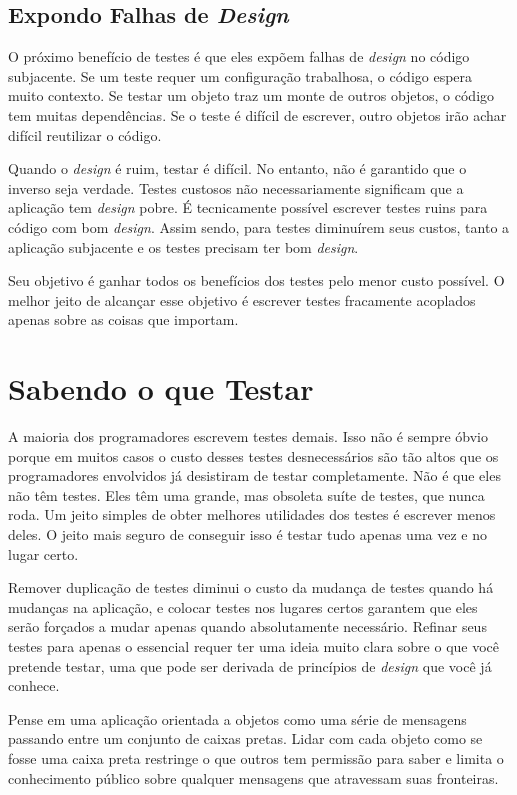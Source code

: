 \subsection{Expondo Falhas de \textit{Design}}

O próximo benefício de testes é que eles expõem falhas de \textit{design} no código subjacente. Se um teste requer um configuração trabalhosa, o código espera muito contexto. Se testar um objeto traz um monte de outros objetos, o código tem muitas dependências. Se o teste é difícil de escrever, outro objetos irão achar difícil reutilizar o código.

Quando o \textit{design} é ruim, testar é difícil. No entanto, não é garantido que o inverso seja verdade. Testes custosos não necessariamente significam que a aplicação tem \textit{design} pobre. É tecnicamente possível escrever testes ruins para código com bom \textit{design}. Assim sendo, para testes diminuírem seus custos, tanto a aplicação subjacente e os testes precisam ter bom \textit{design}.

Seu objetivo é ganhar todos os benefícios dos testes pelo menor custo possível. O melhor jeito de alcançar esse objetivo é escrever testes fracamente acoplados apenas sobre as coisas que importam.

\section{Sabendo o que Testar}

A maioria dos programadores escrevem testes demais. Isso não é sempre óbvio porque em muitos casos o custo desses testes desnecessários são tão altos que os programadores envolvidos já desistiram de testar completamente. Não é que eles não têm testes. Eles têm uma grande, mas obsoleta suíte de testes, que nunca roda. Um jeito simples de obter melhores utilidades dos testes é escrever menos deles. O jeito mais seguro de conseguir isso é testar tudo apenas uma vez e no lugar certo.

Remover duplicação de testes diminui o custo da mudança de testes quando há mudanças na aplicação, e colocar testes nos lugares certos garantem que eles serão forçados a mudar apenas quando absolutamente necessário. Refinar seus testes para apenas o essencial requer ter uma ideia muito clara sobre o que você pretende testar, uma que pode ser derivada de princípios de \textit{design} que você já conhece.

Pense em uma aplicação orientada a objetos como uma série de mensagens passando entre um conjunto de caixas pretas. Lidar com cada objeto como se fosse uma caixa preta restringe o que outros tem permissão para saber e limita o conhecimento público sobre qualquer mensagens que atravessam suas fronteiras.


